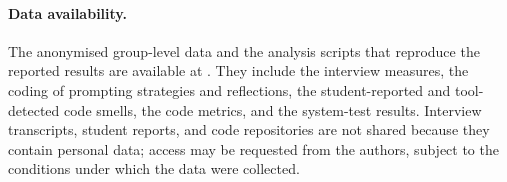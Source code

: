 \paragraph{Data availability.} The anonymised group-level data and the analysis
scripts that reproduce the reported results are available at
. They include the interview measures, the coding of
prompting strategies and reflections, the student-reported and tool-detected
code smells, the code metrics, and the system-test results. Interview
transcripts, student reports, and code repositories are not shared because they
contain personal data; access may be requested from the authors, subject to the
conditions under which the data were collected.
